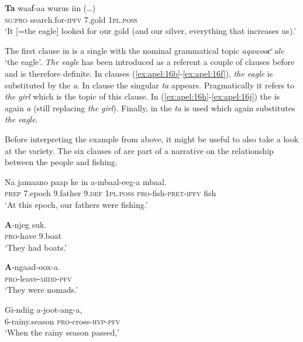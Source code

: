 \documentclass[output=paper,newtxmath,modfonts,nonflat,hidelinks]{langsci/langscibook}
\begin{document}
\ex\label{ex:apel:16k}
\gll \textbf{Ta} waaƭ-aa wurus iin (…)\\
     \textsc{sg:pro} search.for\textsc{-ipfv} \textsc{7.}gold \textsc{1pl.poss}\\
\glt ‘It [=the eagle] looked for our gold (and our silver, everything that increases us).’
\z
\z

The first clause in  is a single  with the nominal grammatical  topic \textit{aqawooƈ ale} ‘the eagle’. \textit{The eagle} has been introduced as a referent a couple of clauses before and is therefore definite. In clauses (\ref{ex:apel:16b}-\ref{ex:apel:16f}), \textit{the eagle} is substituted by the  \textit{a}. In clause  the singular  \textit{ta} appears. Pragmatically it refers to \textit{the girl} which is the topic of this clause. In (\ref{ex:apel:16h}-\ref{ex:apel:16j}) the  is again \textit{a} (still replacing \textit{the girl}). Finally, in  the  \textit{ta} is used which again substitutes \textit{the eagle}.

Before interpreting the example from  above, it might be useful to also take a look at the  variety. The six clauses of  are part of a narrative on the relationship between the  people and fishing.


\ea\label{ex:apel:17}
{  \citep[356]{Renaudier2012}}
\ea\label{ex:apel:17a}
\gll   Na jamaano paap ke in a-mbaal-eeg-a mbaal.\\
     \textsc{prep} 7.epoch 9.father 9.\textsc{def} \textsc{1pl.poss} \textsc{pro}-fish-\textsc{pret-ipfv} fish\\
\glt ‘At this epoch, our fathers were fishing.’
 

\ex\label{ex:apel:17b}
\gll \textbf{A}-njeg suk.\\
     \textsc{pro}-have \textsc{9.}boat \\
\glt ‘They had boats.’
 

\ex\label{ex:apel:17c}
\gll \textbf{A}-ngaad-oox-a.         \\
     \textsc{pro-}leave-\textsc{midd-pfv} \\
\glt ‘They were nomads.’   
 
\ex\label{ex:apel:17d}
\gll Gi-ndiig a-joot-ang-a,  \\
     \textsc{6-}rainy.season \textsc{pro-}cross\textsc{-hyp-pfv}    \\
\glt ‘When the rainy season passed,’
 
\end{document}
